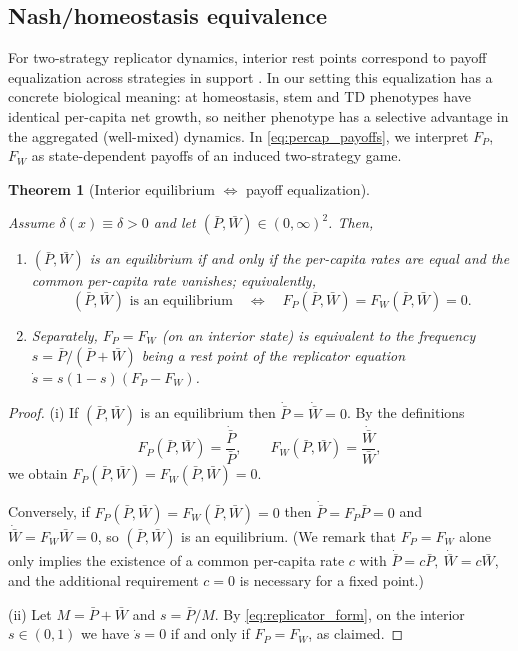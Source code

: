 \documentclass[pdflatex,sn-mathphys-ay]{sn-jnl}
\theoremstyle{thmstyleone}
\newtheorem{theorem}{Theorem}[section]
\theoremstyle{definition}
\theoremstyle{remark}
\begin{document}
\subsection{Nash/homeostasis equivalence}
\label{subsec:nash_homeostasis}
For two-strategy replicator dynamics, interior rest points correspond to payoff equalization across
strategies in support \citep{hofbauer_evolutionary_1998}. In our setting this equalization
has a concrete biological meaning: at homeostasis, stem and TD phenotypes have identical per-capita
net growth, so neither phenotype has a selective advantage in the aggregated (well-mixed) dynamics.
In \eqref{eq:percap_payoffs}, we interpret $F_P$, $F_W$ as state-dependent payoffs of an induced two-strategy game.

\begin{theorem}[Interior equilibrium $\Longleftrightarrow$ payoff equalization]
\label{thm:nash_equiv}

Assume $\delta(x)\equiv\delta>0$ and let $(\bar P,\bar W)\in(0,\infty)^2$. Then,
\begin{enumerate}[label=(\roman*)]
\item $(\bar P, \bar W)$ is an equilibrium if and only if the per-capita rates are equal and the common per-capita rate vanishes; equivalently,
\[
(\bar P, \bar W) \text{ is an equilibrium} \quad \Longleftrightarrow \quad F_P(\bar P,\bar W) = F_W(\bar P,\bar W)= 0.
\]
\item Separately, $F_P=F_W$ (on an interior state) is equivalent to the frequency $s = \bar P/(\bar P + \bar W)$ being a rest point of the replicator equation $\dot s = s(1-s)(F_P-F_W)$. 
\end{enumerate}
\end{theorem}

\begin{proof}
(i) If $(\bar P,\bar W)$ is an equilibrium then $\dot{\bar P}=\dot{\bar W}=0$. By the definitions
\[
F_P(\bar P,\bar W)=\frac{\dot{\bar P}}{\bar P},\qquad 
F_W(\bar P,\bar W)=\frac{\dot{\bar W}}{\bar W},
\]
we obtain $F_P(\bar P,\bar W)=F_W(\bar P,\bar W)=0$.

Conversely, if $F_P(\bar P,\bar W)=F_W(\bar P,\bar W)=0$ then
$\dot{\bar P}=F_P\bar P=0$ and $\dot{\bar W}=F_W\bar W=0$, so $(\bar P,\bar W)$ is an equilibrium.
(We remark that $F_P=F_W$ alone only implies the existence of a common per-capita rate $c$ with
$\dot{\bar P}=c\bar P,\ \dot{\bar W}=c\bar W$, and the additional requirement $c=0$ is necessary
for a fixed point.)

(ii) Let $M=\bar P+\bar W$ and $s=\bar P/M$. By \eqref{eq:replicator_form}, on the interior $s\in(0,1)$ we have $\dot s=0$ if and only if $F_P=F_W$, as claimed.
\end{proof}
\end{document}
